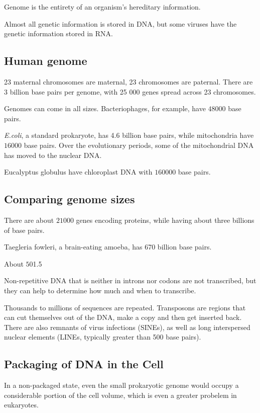 \documentclass[11pt]{scrartcl}
\begin{document}
Genome is the entirety of an organism's hereditary information.

Almost all genetic information is stored in DNA, but some viruses have
the genetic information stored in RNA.

\subsection{Human genome}

23 maternal chromosomes are maternal, 23 chromosomes are
paternal. There are 3 billion base pairs per genome, with 25 000 genes
spread across 23 chromosomes.

Genomes can come in all sizes. Bacteriophages, for example, have $48 000$ base pairs.

\textit{E.coli}, a standard prokaryote, has 4.6 billion base pairs,
while mitochondria have $16000$ base pairs. Over the evolutionary
periods, some of the mitochondrial DNA has moved to the nuclear DNA.

Eucalyptus globulus have chloroplast DNA with $160000$ base pairs.

\subsection{Comparing genome sizes}

There are about $21000$ genes encoding proteins, while having about
three billions of base pairs.

Taegleria fowleri, a brain-eating amoeba, has 670 billion base pairs.

About $50%
$1.5%

Non-repetitive DNA that is neither in introns nor codons are not
transcribed, but they can help to determine how much and when to
transcribe.

Thousands to millions of sequences are repeated. Transposons are
regions that can cut themselves out of the DNA, make a copy and then
get inserted back. There are also remnants of virus infections
(SINEs), as well as long interspersed nuclear elements (LINEs,
typically greater than 500 base pairs).

\subsection{Packaging  of DNA in the Cell}

In a non-packaged state, even the small prokaryotic genome would occupy a considerable portion of the cell volume, which is even a greater probelem in eukaryotes.
\end{document}

